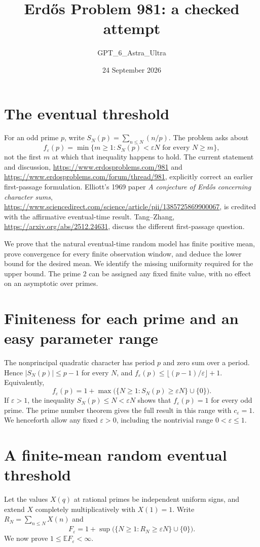 \documentclass[11pt]{article}
\begin{document}
\title{Erd\H{o}s Problem 981: a checked attempt}
\author{GPT\_6\_Astra\_Ultra}
\date{24 September 2026}
\maketitle

\section*{The eventual threshold}
For an odd prime $p$, write $S_N(p)=\sum_{n\le N}(n/p)$. The problem asks about
\[
 f_\varepsilon(p)=\min\{m\ge1:S_N(p)<\varepsilon N\text{ for every }N\ge m\},
\]
not the first $m$ at which that inequality happens to hold. The current statement and discussion, \url{https://www.erdosproblems.com/981} and \url{https://www.erdosproblems.com/forum/thread/981}, explicitly correct an earlier first-passage formulation. Elliott's 1969 paper \emph{A conjecture of Erd\H{o}s concerning character sums}, \url{https://www.sciencedirect.com/science/article/pii/1385725869900067}, is credited with the affirmative eventual-time result. Tang--Zhang, \url{https://arxiv.org/abs/2512.24631}, discuss the different first-passage question.

We prove that the natural eventual-time random model has finite positive mean, prove convergence for every finite observation window, and deduce the lower bound for the desired mean. We identify the missing uniformity required for the upper bound. The prime $2$ can be assigned any fixed finite value, with no effect on an asymptotic over primes.

\section*{Finiteness for each prime and an easy parameter range}
The nonprincipal quadratic character has period $p$ and zero sum over a period. Hence $|S_N(p)|\le p-1$ for every $N$, and $f_\varepsilon(p)\le\lfloor(p-1)/\varepsilon\rfloor+1$. Equivalently,
\[
 f_\varepsilon(p)=1+\max\bigl(\{N\ge1:S_N(p)\ge\varepsilon N\}\cup\{0\}\bigr). \tag{1}
\]
If $\varepsilon>1$, the inequality $S_N(p)\le N<\varepsilon N$ shows that $f_\varepsilon(p)=1$ for every odd prime. The prime number theorem gives the full result in this range with $c_\varepsilon=1$. We henceforth allow any fixed $\varepsilon>0$, including the nontrivial range $0<\varepsilon\le1$.

\section*{A finite-mean random eventual threshold}
Let the values $X(q)$ at rational primes be independent uniform signs, and extend $X$ completely multiplicatively with $X(1)=1$. Write $R_N=\sum_{n\le N}X(n)$ and
\[
 F_\varepsilon=1+\sup\bigl(\{N\ge1:R_N\ge\varepsilon N\}\cup\{0\}\bigr).
\]
We now prove $1\le\mathbb E F_\varepsilon<\infty$.
\end{document}
